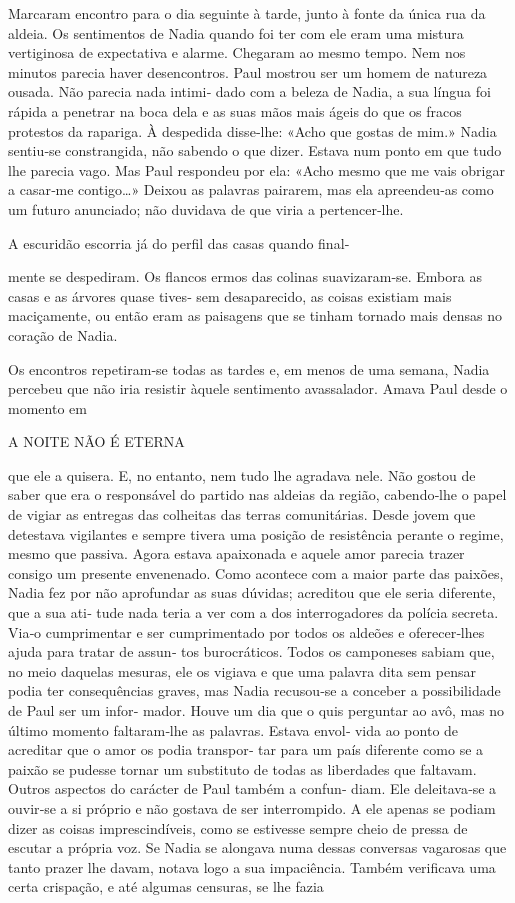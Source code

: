 Marcaram encontro para o dia seguinte à tarde, junto à fonte da única
rua da aldeia. Os sentimentos de Nadia quando foi ter com ele eram uma
mistura vertiginosa de expectativa e alarme. Chegaram ao mesmo tempo.
Nem nos minutos parecia haver desencontros. Paul mostrou ser um homem de
natureza ousada. Não parecia nada intimi‑ dado com a beleza de Nadia, a
sua língua foi rápida a penetrar na boca dela e as suas mãos mais ágeis
do que os fracos protestos da rapariga. À despedida disse‑lhe: «Acho que
gostas de mim.» Nadia sentiu‑se constrangida, não sabendo o que dizer.
Estava num ponto em que tudo lhe parecia vago. Mas Paul respondeu por
ela: «Acho mesmo que me vais obrigar a casar‑me contigo\ldots{}» Deixou
as palavras pairarem, mas ela apreendeu‑as como um futuro anunciado; não
duvidava de que viria a pertencer‑lhe.

A escuridão escorria já do perfil das casas quando final‑

mente se despediram. Os flancos ermos das colinas suavizaram‑se. Embora
as casas e as árvores quase tives‑ sem desaparecido, as coisas existiam
mais maciçamente, ou então eram as paisagens que se tinham tornado mais
densas no coração de Nadia.

Os encontros repetiram‑se todas as tardes e, em menos de uma semana,
Nadia percebeu que não iria resistir àquele sentimento avassalador.
Amava Paul desde o momento em

A NOITE NÃO É ETERNA

que ele a quisera. E, no entanto, nem tudo lhe agradava nele. Não gostou
de saber que era o responsável do partido nas aldeias da região,
cabendo‑lhe o papel de vigiar as entregas das colheitas das terras
comunitárias. Desde jovem que detestava vigilantes e sempre tivera uma
posição de resistência perante o regime, mesmo que passiva. Agora estava
apaixonada e aquele amor parecia trazer consigo um presente envenenado.
Como acontece com a maior parte das paixões, Nadia fez por não
aprofundar as suas dúvidas; acreditou que ele seria diferente, que a sua
ati‑ tude nada teria a ver com a dos interrogadores da polícia secreta.
Via‑o cumprimentar e ser cumprimentado por todos os aldeões e
oferecer‑lhes ajuda para tratar de assun‑ tos burocráticos. Todos os
camponeses sabiam que, no meio daquelas mesuras, ele os vigiava e que
uma palavra dita sem pensar podia ter consequências graves, mas Nadia
recusou‑se a conceber a possibilidade de Paul ser um infor‑ mador. Houve
um dia que o quis perguntar ao avô, mas no último momento faltaram‑lhe
as palavras. Estava envol‑ vida ao ponto de acreditar que o amor os
podia transpor‑ tar para um país diferente como se a paixão se pudesse
tornar um substituto de todas as liberdades que faltavam. Outros
aspectos do carácter de Paul também a confun‑ diam. Ele deleitava‑se a
ouvir‑se a si próprio e não gostava de ser interrompido. A ele apenas se
podiam dizer as coisas imprescindíveis, como se estivesse sempre cheio
de pressa de escutar a própria voz. Se Nadia se alongava numa dessas
conversas vagarosas que tanto prazer lhe davam, notava logo a sua
impaciência. Também verificava uma certa crispação, e até algumas
censuras, se lhe fazia


